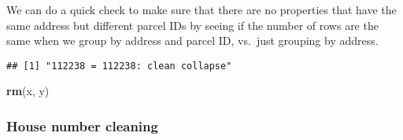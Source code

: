 \documentclass[]{article}
\newenvironment{Shaded}{\begin{snugshade}}{\end{snugshade}}
\newcommand{\KeywordTok}[1]{\textcolor[rgb]{0.13,0.29,0.53}{\textbf{#1}}}
\newcommand{\DecValTok}[1]{\textcolor[rgb]{0.00,0.00,0.81}{#1}}
\newcommand{\StringTok}[1]{\textcolor[rgb]{0.31,0.60,0.02}{#1}}
\newcommand{\ControlFlowTok}[1]{\textcolor[rgb]{0.13,0.29,0.53}{\textbf{#1}}}
\newcommand{\OperatorTok}[1]{\textcolor[rgb]{0.81,0.36,0.00}{\textbf{#1}}}
\newcommand{\NormalTok}[1]{#1}
\begin{document}
We can do a quick check to make sure that there are no properties that
have the same address but different parcel IDs by seeing if the number
of rows are the same when we group by address and parcel ID, vs.~just
grouping by address.

\begin{Shaded}
\end{Shaded}

\begin{verbatim}
## [1] "112238 = 112238: clean collapse"
\end{verbatim}

\begin{Shaded}
\begin{Highlighting}[]
\KeywordTok{rm}\NormalTok{(x, y)}
\end{Highlighting}
\end{Shaded}

\subsubsection{House number cleaning}\label{house-number-cleaning}
\end{document}
